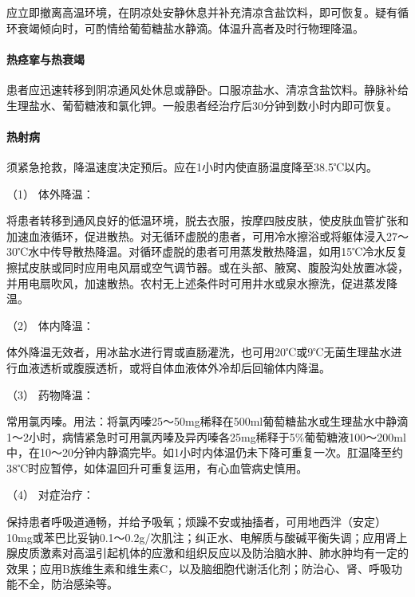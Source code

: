 应立即撤离高温环境，在阴凉处安静休息并补充清凉含盐饮料，即可恢复。疑有循环衰竭倾向时，可酌情给葡萄糖盐水静滴。体温升高者及时行物理降温。

\paragraph{热痉挛与热衰竭}

患者应迅速转移到阴凉通风处休息或静卧。口服凉盐水、清凉含盐饮料。静脉补给生理盐水、葡萄糖液和氯化钾。一般患者经治疗后30分钟到数小时内即可恢复。

\paragraph{热射病}

须紧急抢救，降温速度决定预后。应在1小时内使直肠温度降至38.5℃以内。

\hypertarget{text00354.htmlux5cux23CHP15-1-3-3-1}{}
（1） 体外降温：

将患者转移到通风良好的低温环境，脱去衣服，按摩四肢皮肤，使皮肤血管扩张和加速血液循环，促进散热。对无循环虚脱的患者，可用冷水擦浴或将躯体浸入27～30℃水中传导散热降温。对循环虚脱的患者可用蒸发散热降温，如用15℃冷水反复擦拭皮肤或同时应用电风扇或空气调节器。或在头部、腋窝、腹股沟处放置冰袋，并用电扇吹风，加速散热。农村无上述条件时可用井水或泉水擦洗，促进蒸发降温。

\hypertarget{text00354.htmlux5cux23CHP15-1-3-3-2}{}
（2） 体内降温：

体外降温无效者，用冰盐水进行胃或直肠灌洗，也可用20℃或9℃无菌生理盐水进行血液透析或腹膜透析，或将自体血液体外冷却后回输体内降温。

\hypertarget{text00354.htmlux5cux23CHP15-1-3-3-3}{}
（3） 药物降温：

常用氯丙嗪。用法：将氯丙嗪25～50mg稀释在500ml葡萄糖盐水或生理盐水中静滴1～2小时，病情紧急时可用氯丙嗪及异丙嗪各25mg稀释于5\%葡萄糖液100～200ml中，在10～20分钟内静滴完毕。如1小时内体温仍未下降可重复一次。肛温降至约38℃时应暂停，如体温回升可重复运用，有心血管病史慎用。

\hypertarget{text00354.htmlux5cux23CHP15-1-3-3-4}{}
（4） 对症治疗：

保持患者呼吸道通畅，并给予吸氧；烦躁不安或抽搐者，可用地西泮（安定）10mg或苯巴比妥钠0.1～0.2g/次肌注；纠正水、电解质与酸碱平衡失调；应用肾上腺皮质激素对高温引起机体的应激和组织反应以及防治脑水肿、肺水肿均有一定的效果；应用B族维生素和维生素C，以及脑细胞代谢活化剂；防治心、肾、呼吸功能不全，防治感染等。

\protect\hypertarget{text00355.html}{}{}

